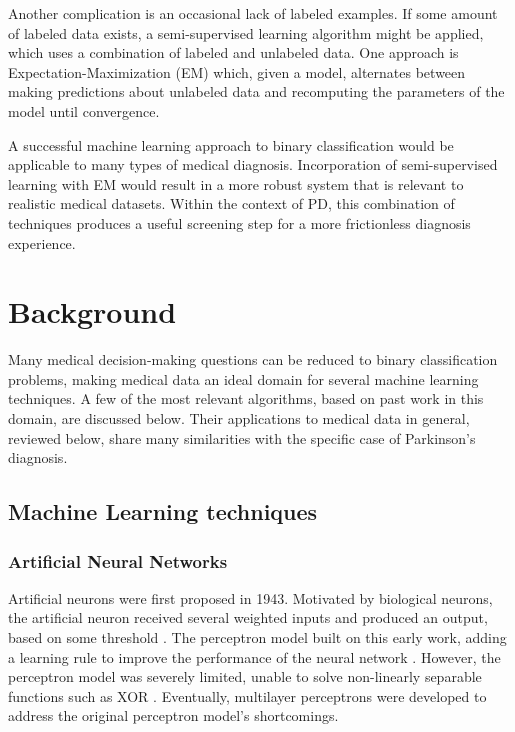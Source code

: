 \documentclass[draftcopy]{srpaper}
\begin{document}
Another complication is an occasional lack of
labeled examples. If some amount of labeled data exists, a
semi-supervised learning algorithm might be applied, which uses
a combination of labeled and unlabeled data. One approach is Expectation-Maximization
(EM) which, given a model, alternates between making predictions about unlabeled data and
recomputing the parameters of the model until convergence.

A successful machine learning approach to binary classification would
be applicable to many types of medical diagnosis. Incorporation of
semi-supervised learning with EM would result in a more robust system
that is relevant to realistic medical datasets. Within the context of
PD, this combination of techniques produces a useful screening step
for a more frictionless diagnosis experience. 

\chapter{Background}
\label{Chapter:Two}
Many medical
decision-making questions can be reduced to binary
classification problems, making medical data an ideal domain for
several machine learning techniques. A few of the most relevant
algorithms, based on past work in this domain, are discussed
below. Their applications to medical data in general, reviewed below,
share many similarities with the specific case of
Parkinson's diagnosis.

\section{Machine Learning techniques}
\subsection{Artificial Neural Networks}
Artificial neurons were first proposed in 1943. Motivated by biological neurons, the artificial neuron received
several weighted inputs and produced an output, based on some
threshold \cite{MP43}. The perceptron model built on this early
work, adding a learning rule to improve the performance of the neural
network \cite{Ros58}. However, the perceptron model was severely limited, unable to
solve non-linearly separable functions such as XOR \cite{MP69}. Eventually, multilayer perceptrons were developed to
address the original perceptron model's shortcomings. 
\end{document}
